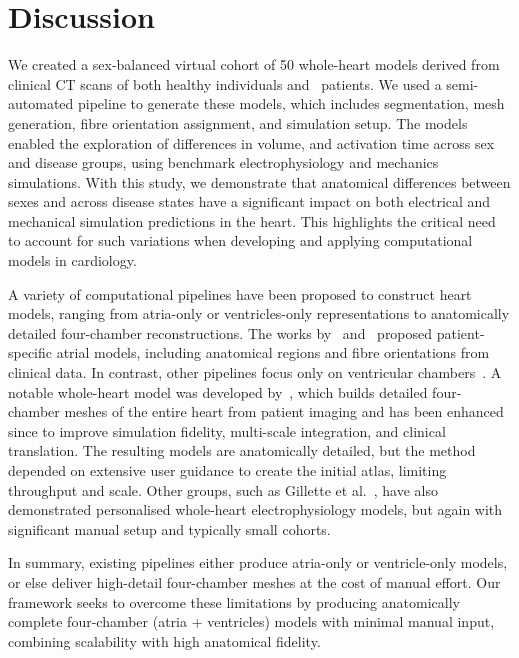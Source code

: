 \section{Discussion}
We created a sex-balanced virtual cohort of 50 whole-heart models derived from clinical CT scans of 
both healthy individuals and \HF\ patients. 
We used a semi-automated pipeline to generate these models,
which includes segmentation, mesh generation, fibre orientation assignment, and simulation setup.
The models enabled the exploration of differences in volume, and activation time across sex and disease groups, 
using benchmark electrophysiology and mechanics simulations. 
With this study, we demonstrate that anatomical differences between sexes and across disease states have a 
significant impact on both electrical and mechanical simulation predictions in the heart. 
This highlights the critical need to account for such variations when developing and 
applying computational models in cardiology.

A variety of computational pipelines have been proposed to construct heart models, 
ranging from atria-only or ventricles-only representations to anatomically detailed four-chamber reconstructions.
The works by~\cite{roney-2023-atriamodels} and~\cite{azzolin-2023-atriamodels} proposed 
patient-specific atrial models, including anatomical regions and fibre orientations from clinical data.
In contrast, other pipelines focus only on ventricular chambers~\cite{govil-2023-bivmodels,banerjee-2021-bivmodels}.
A notable whole-heart model was developed by~\cite{zhang-2012-fourchmodels}, 
which builds detailed four-chamber meshes of the entire heart from patient imaging and has been enhanced 
since to improve 
simulation fidelity, 
multi-scale integration, and 
clinical translation.
The resulting models are anatomically detailed, but the method depended on extensive user guidance to 
create the initial atlas, limiting throughput and scale.
Other groups, such as Gillette et al.~\cite{gillette_personalized_2022}, have also 
demonstrated personalised whole-heart electrophysiology models, but again with 
significant manual setup and typically small cohorts.

In summary, existing pipelines either produce atria-only or ventricle-only models, 
or else deliver high-detail four-chamber meshes at the cost of manual effort.
Our framework seeks to overcome these limitations by producing anatomically complete four-chamber 
(atria + ventricles) models with minimal manual input, combining scalability with high anatomical fidelity.


